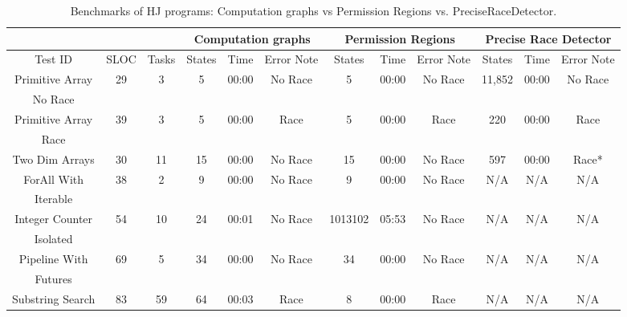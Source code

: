 \begin{landscape}
\begin{table*}
\centering
\caption{Benchmarks of HJ programs: Computation graphs vs Permission Regions vs. PreciseRaceDetector.}
\label{tab:results}
\begin{tabular}{|c|c|c|c|c|c|c|c|c|c|c|c|}
\hline
        &      &       & 
        \multicolumn{3}{c|}{Computation graphs} & 
		 \multicolumn{3}{c|}{Permission Regions} &
		\multicolumn{3}{c|}{Precise Race Detector} \\ \hline
		
Test ID & SLOC & Tasks 
& States  & Time  & Error Note 
& States  & Time  & Error Note 
& States  & Time  & Error Note     \\ \hline

Primitive Array & 29 & 3 
& 5 & 00:00 & No Race
& 5 & 00:00 & No Race 
& 11,852 & 00:00 & No Race \\
No Race &  & 
& & &
& & &
& & & \\ \hline

Primitive Array & 39 & 3 
& 5 & 00:00 & Race
& 5 & 00:00 & Race
& 220 & 00:00 & Race \\ 
Race &  & 
& & &
& & &
& & & \\ \hline

Two Dim Arrays & 30 & 11 
& 15 & 00:00 & No Race
& 15 & 00:00 & No Race 
& 597 & 00:00 & Race* \\ \hline

ForAll With & 38 & 2
& 9 & 00:00 & No Race
& 9 & 00:00 & No Race 
& N/A & N/A & N/A \\ 
Iterable &  & 
& & &
& & &
& & & \\ \hline

Integer Counter  & 54 & 10
& 24 & 00:01 & No Race
& 1013102 & 05:53 & No Race 
& N/A & N/A & N/A \\ 
Isolated &  & 
& & &
& & &
& & & \\ \hline


Pipeline With & 69 & 5
& 34 & 00:00 & No Race
& 34 & 00:00 & No Race 
& N/A & N/A & N/A \\ 
Futures &  & 
& & &
& & &
& & & \\ \hline

Substring Search  & 83 & 59 
& 64 & 00:03 & Race
& 8 & 00:00 & Race 
& N/A & N/A & N/A \\ \hline


\end{tabular}
\end{table*}
\end{landscape}
